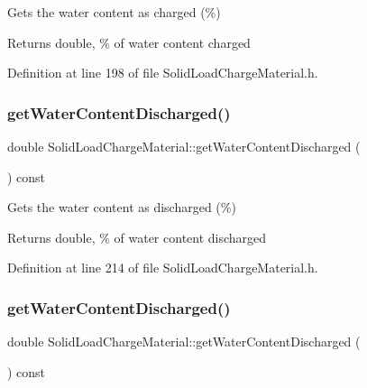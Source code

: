 Gets the water content as charged (\%) \begin{DoxyReturn}{Returns}
double, \% of water content charged 
\end{DoxyReturn}


Definition at line 198 of file Solid\+Load\+Charge\+Material.\+h.

\mbox{\label{class_solid_load_charge_material_aeeb6b341a6b5770155b85264dabbd1a7}} 
\subsubsection{\texorpdfstring{get\+Water\+Content\+Discharged()}{getWaterContentDischarged()}\hspace{0.1cm}{\footnotesize\ttfamily [1/3]}}
{\footnotesize\ttfamily double Solid\+Load\+Charge\+Material\+::get\+Water\+Content\+Discharged (\begin{DoxyParamCaption}{ }\end{DoxyParamCaption}) const\hspace{0.3cm}{\ttfamily [inline]}}

Gets the water content as discharged (\%) \begin{DoxyReturn}{Returns}
double, \% of water content discharged 
\end{DoxyReturn}


Definition at line 214 of file Solid\+Load\+Charge\+Material.\+h.

\mbox{\label{class_solid_load_charge_material_aeeb6b341a6b5770155b85264dabbd1a7}} 
\subsubsection{\texorpdfstring{get\+Water\+Content\+Discharged()}{getWaterContentDischarged()}\hspace{0.1cm}{\footnotesize\ttfamily [2/3]}}
{\footnotesize\ttfamily double Solid\+Load\+Charge\+Material\+::get\+Water\+Content\+Discharged (\begin{DoxyParamCaption}{ }\end{DoxyParamCaption}) const\hspace{0.3cm}{\ttfamily [inline]}}

